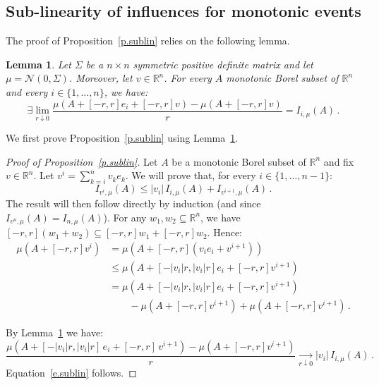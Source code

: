 \documentclass[11pt]{article}
\newtheorem{lemm}[theo]{Lemma}
\theoremstyle{definition}
\numberwithin{equation}{section}
\newcommand{\R}{\mathbb{R}}
\let\oldexists\exists
\renewcommand*{\exists}{\mathrel{\oldexists}}
\begin{document}
\subsection{Sub-linearity of influences for monotonic events}\label{ss.monotonic}

The proof of Proposition~\ref{p.sublin} relies on the following lemma.

\begin{lemm}\label{l.conv}
Let $\Sigma$ be a $n \times n$ symmetric positive definite matrix and let $\mu = \mathcal{N}(0,\Sigma)$. Moreover, let $v \in \R^n$. For every $A$ monotonic Borel subset of $\R^n$ and every $i \in \lbrace 1,\dots, n \rbrace$, we have:
\[
\exists \lim_{r \downarrow 0} \frac{\mu \left(A + [-r,r] e_i + [-r,r]v \right) - \mu \left(A + [-r,r]v \right)}{r} = I_{i,\mu}(A) \,.
\]
\end{lemm}

We first prove Proposition~\ref{p.sublin} using Lemma~\ref{l.conv}.

\begin{proof}[Proof of Proposition~\ref{p.sublin}]
Let $A$ be a monotonic Borel subset of $\R^n$ and fix $v \in \R^n$. Let $v^i=\sum_{k=i}^n v_k e_k$. We will prove that, for every $i \in \{ 1,\dots, n-1 \}$:
\begin{equation}\label{e.sublin}
I_{v^i,\mu}(A) \leq |v_i| \, I_{i,\mu}(A) + I_{v^{i+1},\mu}(A) \,.
\end{equation}
The result will then follow directly by induction (and since $I_{v^{n},\mu}(A)= I_{n,\mu}(A)$). For any $w_1,w_2 \subseteq \R^n$, we have $[-r,r](w_1+w_2) \subseteq [-r,r]w_1+[-r,r]w_2$. Hence:
\begin{align*}
\mu \left(A + [-r,r]v^i \right) &=\mu \left(A + [-r,r] \left(v_i e_i + v^{i+1} \right) \right)\\
&\leq \mu \left(A + [-|v_i| r,|v_i| r] e_i + [-r,r] v^{i+1} \right)\\
&= \mu \left(A + [-|v_i| r,|v_i| r] e_i + [-r,r] v^{i+1} \right)\\
&\qquad - \mu \left(A + [-r,r] v^{i+1} \right) + \mu \left(A + [-r,r] v^{i+1} \right) \,.
\end{align*}

By Lemma~\ref{l.conv} we have:
\[
\frac{\mu \left(A + [-|v_i| r,|v_i| r] \, e_i + [-r,r] \, v^{i+1} \right) - \mu \left(A + [-r,r]v^{i+1} \right)}{r} \underset{r \downarrow 0}{\longrightarrow} |v_i| \, I_{i,\mu}(A) \,.
\]
Equation~\eqref{e.sublin} follows.
\end{proof}
\end{document}
